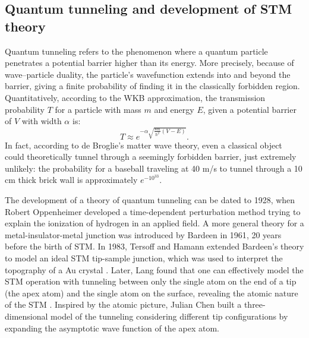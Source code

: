 \subsection{Quantum tunneling and development of STM theory}
Quantum tunneling refers to the phenomenon where a quantum particle penetrates a potential barrier higher than its energy. More precisely, because of wave–particle duality, the particle’s wavefunction extends into and beyond the barrier, giving a finite probability of finding it in the classically forbidden region. Quantitatively, according to the WKB approximation, the transmission probability $T$ for a particle with mass $m$ and energy $E$, given a potential barrier of $V$ with width $\alpha$ is: 
\begin{equation}
	T \approx e^{-\alpha\sqrt{\frac{8m}{\hslash^2}(V-E)}}. 
\end{equation}
In fact, according to de Broglie's  matter wave theory, even a classical object could theoretically tunnel through a seemingly forbidden barrier, just extremely unlikely: the probability for a baseball traveling at 40 m/s to tunnel through a 10 cm thick brick wall is approximately $e^{-10^{33}}$. 

The development of a theory of quantum tunneling can be dated to 1928, when Robert Oppenheimer developed a time-dependent perturbation method trying to explain the ionization of hydrogen in an applied field\cite{oppenheimerThreeNotesQuantum1928}. A more general theory for a metal-insulator-metal junction was introduced by Bardeen in 1961\cite{bardeenTunnellingManyParticlePoint1961}, 20 years before the birth of \ac{STM}. In 1983, Tersoff and Hamann extended Bardeen's theory to model an ideal STM tip-sample junction, which was used to interpret the topography of a Au crystal \cite{tersoffTheoryApplicationScanning1983}\cite{tersoffTheoryScanningTunneling1985}. Later, Lang found that one can effectively model the \ac{STM} operation with tunneling between only the single atom on the end of a tip (the apex atom) and the single atom on the surface, revealing the atomic nature of the \ac{STM} \cite{langVacuumTunnelingCurrent1985}\cite{langSpectroscopySingleAtoms1986}\cite{langApparentSizeAtom1987}. Inspired by the atomic picture, Julian Chen built a three-dimensional model of the tunneling considering different tip configurations by expanding the asymptotic wave function of the apex atom\cite{chenTunnelingMatrixElements1990}\cite{chenTheoryScanningTunneling1988}.  

